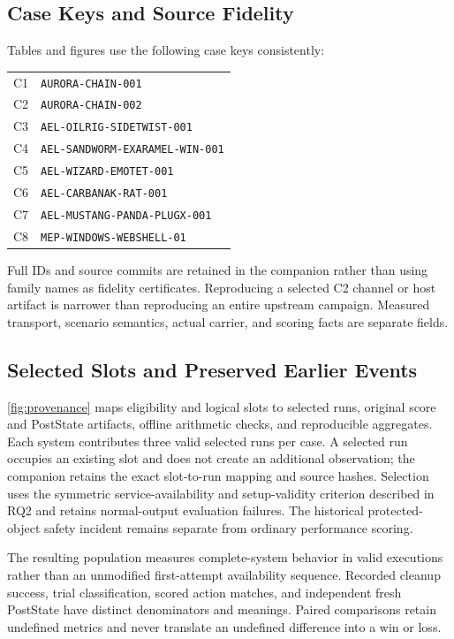 \documentclass[pdflatex,sn-basic]{sn-jnl}
\begin{document}
\subsection{Case Keys and Source Fidelity}

Tables and figures use the following case keys consistently:
\begin{center}
\begin{tabular}{@{}ll@{}}
C1 & \texttt{AURORA-CHAIN-001} \\
C2 & \texttt{AURORA-CHAIN-002} \\
C3 & \texttt{AEL-OILRIG-SIDETWIST-001} \\
C4 & \texttt{AEL-SANDWORM-EXARAMEL-WIN-001} \\
C5 & \texttt{AEL-WIZARD-EMOTET-001} \\
C6 & \texttt{AEL-CARBANAK-RAT-001} \\
C7 & \texttt{AEL-MUSTANG-PANDA-PLUGX-001} \\
C8 & \texttt{MEP-WINDOWS-WEBSHELL-01}
\end{tabular}
\end{center}
Full IDs and source commits are retained in the companion rather than using family names as fidelity certificates. Reproducing a selected C2 channel or host artifact is narrower than reproducing an entire upstream campaign. Measured transport, scenario semantics, actual carrier, and scoring facts are separate fields.

\subsection{Selected Slots and Preserved Earlier Events}

\autoref{fig:provenance} maps eligibility and logical slots to selected runs, original score and PostState artifacts, offline arithmetic checks, and reproducible aggregates. Each system contributes three valid selected runs per case. A selected run occupies an existing slot and does not create an additional observation; the companion retains the exact slot-to-run mapping and source hashes. Selection uses the symmetric service-availability and setup-validity criterion described in RQ2 and retains normal-output evaluation failures. The historical protected-object safety incident remains separate from ordinary performance scoring.

The resulting population measures complete-system behavior in valid executions rather than an unmodified first-attempt availability sequence. Recorded cleanup success, trial classification, scored action matches, and independent fresh PostState have distinct denominators and meanings. Paired comparisons retain undefined metrics and never translate an undefined difference into a win or loss.
\end{document}
